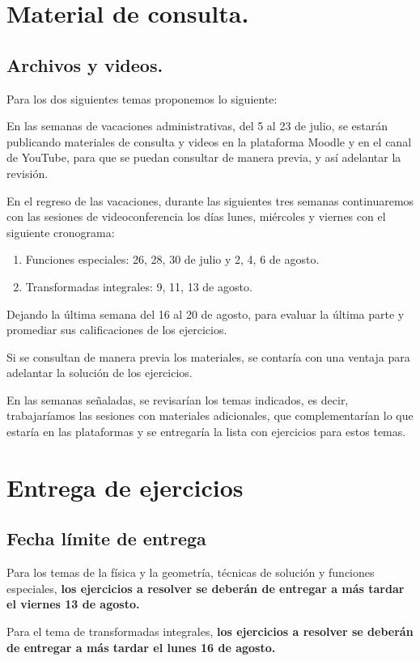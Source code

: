 \section{Material de consulta.}
\subsection{Archivos y videos.}

Para los dos siguientes temas proponemos lo siguiente:
\par
En las semanas de vacaciones administrativas, del 5 al 23 de julio, se estarán publicando materiales de consulta y videos en la plataforma Moodle y en el canal de YouTube, para que se puedan consultar de manera previa, y así adelantar la revisión.
\par
En el regreso de las vacaciones, durante las siguientes tres semanas continuaremos con las sesiones de videoconferencia los días lunes, miércoles y viernes con el siguiente cronograma:
\begin{enumerate}
\item Funciones especiales: 26, 28, 30 de julio y 2, 4, 6 de agosto.
\item Transformadas integrales: 9, 11, 13 de agosto.
\end{enumerate}

Dejando la última semana del 16 al 20 de agosto, para evaluar la última parte y promediar sus calificaciones de los ejercicios.
\par
Si se consultan de manera previa los materiales, se contaría con una ventaja para adelantar la solución de los ejercicios.
\par
En las semanas señaladas, se revisarían los temas indicados, es decir, trabajaríamos las sesiones con materiales adicionales, que complementarían lo que estaría en las plataformas y se entregaría la lista con ejercicios para estos temas.

\section{Entrega de ejercicios}
\subsection{Fecha límite de entrega}

Para los temas de la física y la geometría, técnicas de solución y funciones especiales, \textbf{los ejercicios a resolver se deberán de entregar a más tardar el viernes 13 de agosto.}
\par
Para el tema de transformadas integrales, \textbf{los ejercicios a resolver se deberán de entregar a más tardar el lunes 16 de agosto.}

